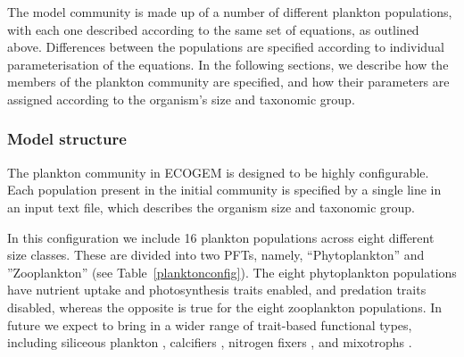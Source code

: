 \documentclass[gmd, manuscript]{copernicus}
\begin{document}
{The model community is made up of a number of different plankton populations, with each one described according to the same set of equations, as outlined above. Differences between the populations are specified according to individual parameterisation of the equations. In the following sections, we describe how the members of the plankton community are specified, and how their parameters are assigned according to the organism's size and taxonomic group.

\subsubsection{Model structure}\label{community_structure}

The plankton community in ECOGEM is designed to be highly configurable. Each population present in the initial community is specified by a single line in an input text file, which describes the organism size and taxonomic group.


In this configuration we include 16 plankton populations across eight different size classes. These are divided into two PFTs, namely, ``Phytoplankton'' and ''Zooplankton'' (see Table~\ref{planktonconfig}). The eight phytoplankton populations have nutrient uptake and photosynthesis traits enabled, and predation traits disabled, whereas the opposite is true for the eight zooplankton populations. In future we expect to bring in a wider range of trait-based functional types, including siliceous plankton \citep[e.g.][]{Follows:2007}, calcifiers \citep{Monteiro:2016}, nitrogen fixers \citep{Monteiro:2010}, and mixotrophs \citep{Ward:2016}.

}
\end{document}
